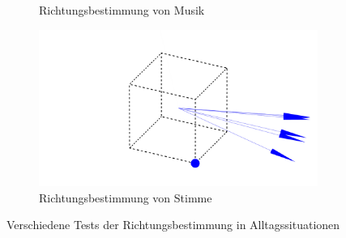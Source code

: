 \begin{figure}[H]
\begin{subfigure}[b]{0.475\textwidth}
    \caption{Richtungsbestimmung von Musik\label{fig:music}}
  \end{subfigure}
  \hfill
  \begin{subfigure}[b]{0.475\textwidth}
    \centering
    \includegraphics[width=\textwidth]{img/sprechen.png}
    \caption{Richtungsbestimmung von Stimme\label{fig:speech}}
  \end{subfigure}
  \caption{Verschiedene Tests der Richtungsbestimmung in Alltagssituationen\label{fig:tests}}
\end{figure}